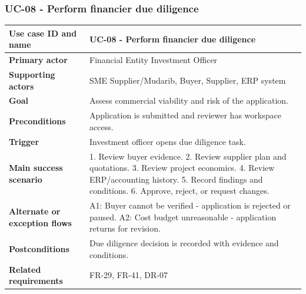 \documentclass[11pt,a4paper]{article}
\begin{document}
\subsubsection{UC-08 - Perform financier due diligence}
\begin{footnotesize}
\begin{longtable}{@{}p{}p{}@{}}
\rowcolor{gray!10}\textbf{Use case ID and name} & UC-08 - Perform financier due diligence \\ \hline
\rowcolor{gray!10}\textbf{Primary actor} & Financial Entity Investment Officer \\ \hline
\rowcolor{gray!10}\textbf{Supporting actors} & SME Supplier/Mudarib, Buyer, Supplier, ERP system \\ \hline
\rowcolor{gray!10}\textbf{Goal} & Assess commercial viability and risk of the application. \\ \hline
\rowcolor{gray!10}\textbf{Preconditions} & Application is submitted and reviewer has workspace access. \\ \hline
\rowcolor{gray!10}\textbf{Trigger} & Investment officer opens due diligence task. \\ \hline
\rowcolor{gray!10}\textbf{Main success scenario} & 1. Review buyer evidence. 2. Review supplier plan and quotations. 3. Review project economics. 4. Review ERP/accounting history. 5. Record findings and conditions. 6. Approve, reject, or request changes. \\ \hline
\rowcolor{gray!10}\textbf{Alternate or exception flows} & A1: Buyer cannot be verified - application is rejected or paused. A2: Cost budget unreasonable - application returns for revision. \\ \hline
\rowcolor{gray!10}\textbf{Postconditions} & Due diligence decision is recorded with evidence and conditions. \\ \hline
\rowcolor{gray!10}\textbf{Related requirements} & FR-29, FR-41, DR-07 \\ \hline
\end{longtable}
\end{footnotesize}
\end{document}
